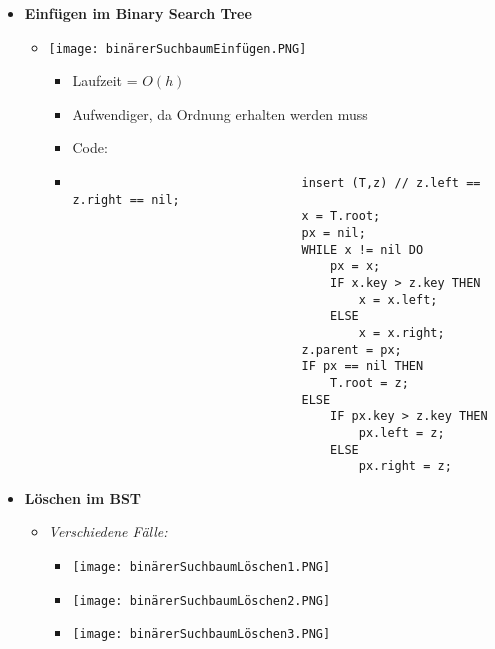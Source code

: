 \begin{itemize}
        \item \textbf{Einfügen im Binary Search Tree}
            \begin{itemize}
                \item[]
                    \begin{minipage}{0.4\textwidth}
                        \texttt{[image: binärerSuchbaumEinfügen.PNG]}
                    \end{minipage}
                    \begin{minipage}{0.5\textwidth}
                        \begin{itemize}
                            \item Laufzeit = $O(h)$
                            \item Aufwendiger, da Ordnung erhalten werden muss
                            \item Code:
                            \item[]
                                \begin{verbatim}
                                insert (T,z) // z.left == z.right == nil;
                                x = T.root;
                                px = nil;
                                WHILE x != nil DO
                                    px = x;
                                    IF x.key > z.key THEN
                                        x = x.left;
                                    ELSE 
                                        x = x.right;
                                z.parent = px;
                                IF px == nil THEN
                                    T.root = z;
                                ELSE 
                                    IF px.key > z.key THEN
                                        px.left = z;
                                    ELSE 
                                        px.right = z;
                                \end{verbatim}
                        \end{itemize}
                    \end{minipage}
            \end{itemize}

\pagebreak

        \item \textbf{Löschen im BST}
            \begin{itemize}
                \item \textit{Verschiedene Fälle:}
                    \begin{itemize}
                        \item[] \texttt{[image: binärerSuchbaumLöschen1.PNG]}
                        \item[] \texttt{[image: binärerSuchbaumLöschen2.PNG]} 
                        \item[] \texttt{[image: binärerSuchbaumLöschen3.PNG]} 
                    \end{itemize}


\end{itemize}
\end{itemize}
